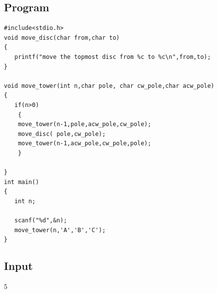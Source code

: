 \documentclass[11pt]{article}
\begin{document}
\subsection*{Program}
\label{sec-2-4}

\begin{verbatim}
#include<stdio.h>
void move_disc(char from,char to)
{
   printf("move the topmost disc from %c to %c\n",from,to);
}

void move_tower(int n,char pole, char cw_pole,char acw_pole)
{
   if(n>0)
    {
	move_tower(n-1,pole,acw_pole,cw_pole);
	move_disc( pole,cw_pole);
	move_tower(n-1,acw_pole,cw_pole,pole);
    }

}
int main()
{
   int n;

   scanf("%d",&n);
   move_tower(n,'A','B','C');
}
\end{verbatim}
\subsection*{Input}
\label{sec-2-5}
5
\end{document}

